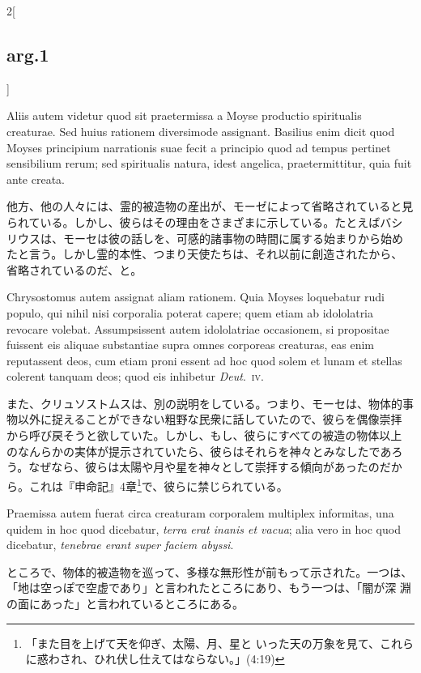 \documentclass[paper=a4paper,fontsize=10pt,jafontsize=9pt,titlepage]{jlreq}
\begin{document}
\begin{paracol}{2}[\subsection{arg.1}]
\switchcolumn*

Aliis autem videtur
quod sit praetermissa a Moyse productio spiritualis creaturae. Sed huius
rationem diversimode assignant. Basilius enim dicit quod Moyses
principium narrationis suae fecit a principio quod ad tempus pertinet
sensibilium rerum; sed spiritualis natura, idest angelica,
praetermittitur, quia fuit ante creata.

\switchcolumn

他方、他の人々には、霊的被造物の産出が、モーゼによって省略されていると見
 られている。しかし、彼らはその理由をさまざまに示している。たとえばバシ
 リウスは、モーセは彼の話しを、可感的諸事物の時間に属する始まりから始め
 たと言う。しかし霊的本性、つまり天使たちは、それ以前に創造されたから、
 省略されているのだ、と。

\switchcolumn*

Chrysostomus autem assignat
aliam rationem. Quia Moyses loquebatur rudi populo, qui nihil nisi
corporalia poterat capere; quem etiam ab idololatria revocare
volebat. Assumpsissent autem idololatriae occasionem, si propositae
fuissent eis aliquae substantiae supra omnes corporeas creaturas, eas
enim reputassent deos, cum etiam proni essent ad hoc quod solem et lunam
et stellas colerent tanquam deos; quod eis inhibetur {\itshape Deut}.~{\scshape iv}.

\switchcolumn

また、クリュソストムスは、別の説明をしている。つまり、モーセは、物体的事
 物以外に捉えることができない粗野な民衆に話していたので、彼らを偶像崇拝
 から呼び戻そうと欲していた。しかし、もし、彼らにすべての被造の物体以上
 のなんらかの実体が提示されていたら、彼らはそれらを神々とみなしたであろ
 う。なぜなら、彼らは太陽や月や星を神々として崇拝する傾向があったのだか
 ら。これは『申命記』4章\footnote{「また目を上げて天を仰ぎ、太陽、月、星と
 いった天の万象を見て、これらに惑わされ、ひれ伏し仕えてはならない。」(4:19)}で、彼らに禁じられている。

\switchcolumn*

Praemissa autem fuerat circa creaturam corporalem multiplex informitas,
una quidem in hoc quod dicebatur, {\itshape terra erat inanis et vacua};
alia vero in hoc quod dicebatur, {\itshape tenebrae erant super faciem
abyssi}.

\switchcolumn

ところで、物体的被造物を巡って、多様な無形性が前もって示された。一つは、
 「地は空っぽで空虚であり」と言われたところにあり、もう一つは、「闇が深
 淵の面にあった」と言われているところにある。


\end{paracol}
\end{document}
